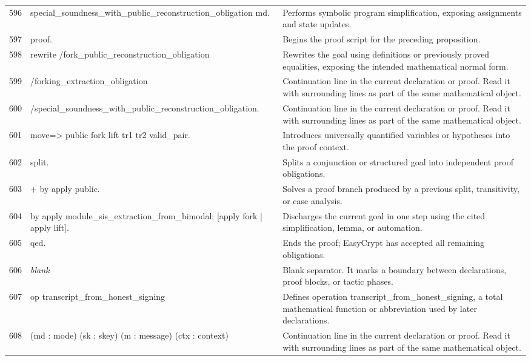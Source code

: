 \documentclass[10pt]{article}
\begin{document}
\begin{longtable}{r L{0.53\textwidth} L{0.37\textwidth}}
596 & {\ttfamily\scriptsize   special\_soundness\_with\_public\_reconstruction\_obligation md.} & Performs symbolic program simplification, exposing assignments and state updates. \\
597 & {\ttfamily\scriptsize proof.} & Begins the proof script for the preceding proposition. \\
598 & {\ttfamily\scriptsize rewrite /fork\_public\_reconstruction\_obligation} & Rewrites the goal using definitions or previously proved equalities, exposing the intended mathematical normal form. \\
599 & {\ttfamily\scriptsize         /forking\_extraction\_obligation} & Continuation line in the current declaration or proof.  Read it with surrounding lines as part of the same mathematical object. \\
600 & {\ttfamily\scriptsize         /special\_soundness\_with\_public\_reconstruction\_obligation.} & Continuation line in the current declaration or proof.  Read it with surrounding lines as part of the same mathematical object. \\
601 & {\ttfamily\scriptsize move=> public fork lift tr1 tr2 valid\_pair.} & Introduces universally quantified variables or hypotheses into the proof context. \\
602 & {\ttfamily\scriptsize split.} & Splits a conjunction or structured goal into independent proof obligations. \\
603 & {\ttfamily\scriptsize + by apply public.} & Solves a proof branch produced by a previous split, transitivity, or case analysis. \\
604 & {\ttfamily\scriptsize by apply module\_sis\_extraction\_from\_bimodal; [apply fork | apply lift].} & Discharges the current goal in one step using the cited simplification, lemma, or automation. \\
605 & {\ttfamily\scriptsize qed.} & Ends the proof; EasyCrypt has accepted all remaining obligations. \\
606 & {\ttfamily\scriptsize \emph{blank}} & Blank separator.  It marks a boundary between declarations, proof blocks, or tactic phases. \\
607 & {\ttfamily\scriptsize op transcript\_from\_honest\_signing} & Defines operation transcript\_from\_honest\_signing, a total mathematical function or abbreviation used by later declarations. \\
608 & {\ttfamily\scriptsize    (md : mode) (sk : skey) (m : message) (ctx : context)} & Continuation line in the current declaration or proof.  Read it with surrounding lines as part of the same mathematical object. \\

\end{longtable}
\end{document}
